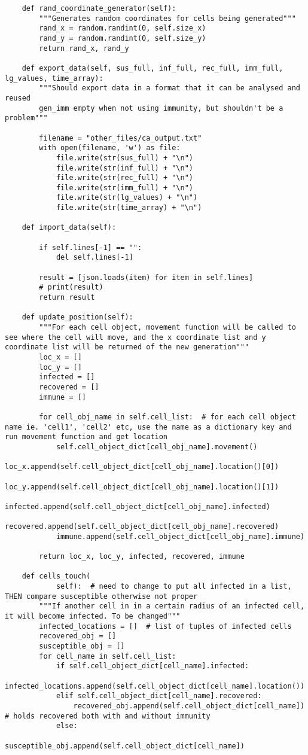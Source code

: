\documentclass[11pt, a4paper]{article}
\begin{document}
\begin{lstlisting}
    def rand_coordinate_generator(self):
        """Generates random coordinates for cells being generated"""
        rand_x = random.randint(0, self.size_x)
        rand_y = random.randint(0, self.size_y)
        return rand_x, rand_y

    def export_data(self, sus_full, inf_full, rec_full, imm_full, lg_values, time_array):
        """Should export data in a format that it can be analysed and reused
        gen_imm empty when not using immunity, but shouldn't be a problem"""
    
        filename = "other_files/ca_output.txt"
        with open(filename, 'w') as file:
            file.write(str(sus_full) + "\n")
            file.write(str(inf_full) + "\n")
            file.write(str(rec_full) + "\n")
            file.write(str(imm_full) + "\n")
            file.write(str(lg_values) + "\n")
            file.write(str(time_array) + "\n")

    def import_data(self):

        if self.lines[-1] == "":
            del self.lines[-1]

        result = [json.loads(item) for item in self.lines]
        # print(result)
        return result

    def update_position(self):
        """For each cell object, movement function will be called to see where the cell will move, and the x coordinate list and y coordinate list will be returned of the new generation"""
        loc_x = []
        loc_y = []
        infected = []
        recovered = []
        immune = []

        for cell_obj_name in self.cell_list:  # for each cell object name ie. 'cell1', 'cell2' etc, use the name as a dictionary key and run movement function and get location
            self.cell_object_dict[cell_obj_name].movement()
            loc_x.append(self.cell_object_dict[cell_obj_name].location()[0])
            loc_y.append(self.cell_object_dict[cell_obj_name].location()[1])
            infected.append(self.cell_object_dict[cell_obj_name].infected)
            recovered.append(self.cell_object_dict[cell_obj_name].recovered)
            immune.append(self.cell_object_dict[cell_obj_name].immune)

        return loc_x, loc_y, infected, recovered, immune

    def cells_touch(
            self):  # need to change to put all infected in a list, THEN compare susceptible otherwise not proper
        """If another cell in in a certain radius of an infected cell, it will become infected. To be changed"""
        infected_locations = []  # list of tuples of infected cells
        recovered_obj = []
        susceptible_obj = []
        for cell_name in self.cell_list:
            if self.cell_object_dict[cell_name].infected:
                infected_locations.append(self.cell_object_dict[cell_name].location())
            elif self.cell_object_dict[cell_name].recovered:
                recovered_obj.append(self.cell_object_dict[cell_name])  # holds recovered both with and without immunity
            else:
                susceptible_obj.append(self.cell_object_dict[cell_name])


\end{lstlisting}
\end{document}
